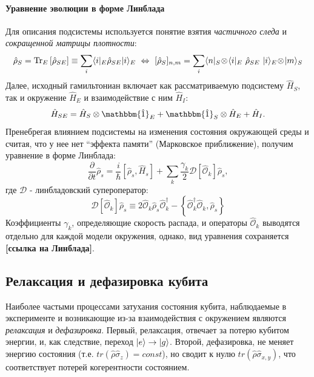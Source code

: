 \documentclass[12pt, twoside]{report}
\newcommand{\pTr}[2]{\text{Tr}_{#1}\left[#2\right]}
\DeclarePairedDelimiter\bra{\langle}{\rvert}
\DeclarePairedDelimiter\ket{\lvert}{\rangle}
\newcommand{\sbrkt}[1]{\left[ #1 \right]}
\numberwithin{equation}{section}
\numberwithin{figure}{section}
\begin{document}
\paragraph{Уравнение эволюции в форме Линблада}
Для описания подсистемы используется понятие взятия \textit{частичного следа} и \textit{сокращенной матрицы плотности}: 
\[
\hat \rho_S = \pTr{E}{\hat \rho_{SE}} \equiv \sum_i \bra{i}_E \hat \rho_{SE} \ket{i}_E \ \Leftrightarrow \ [\hat \rho_S]_{n, m} = \sum_i \bra{n}_S \! \otimes\! \bra{i}_E\ \hat \rho_{SE}\ \ket{i}_E\!\otimes\! \ket{m}_S
\] 
Далее, исходный гамильтониан включает как рассматриваемую подсистему $\hat{H}_S$, так и окружение $\hat{H}_E$ и взаимодействие с ним $\hat{H}_I$:
\begin{equation}
\hat{H}_{SE} = \hat{H}_S \otimes \mathbbm{\hat 1}_E + \mathbbm{\hat 1}_S \otimes \hat{H}_E + \hat{H}_I. 
\end{equation}
Пренебрегая влиянием подсистемы на изменения состояния окружающей среды и считая, что у нее нет ``эффекта памяти'' (Марковское приближение), получим уравнение в форме Линблада:
\begin{equation}
 \frac{\partial}{\partial t}\hat \rho_s = 
 \frac{i}{\hbar}\sbrkt{\hat \rho_s, \hat{H}_s} + \sum_k \frac{\gamma_k}{2} \mathcal{D}\sbrkt{\mathcal{\hat O}_k}\hat \rho_s,
\label{eq:linbladian-equation}
\end{equation}
где $\mathcal{D}$ - линбладовский супероператор:
\begin{equation}
\mathcal{D}\sbrkt{\mathcal{\hat O}_k}\hat \rho_s \equiv 2 \mathcal{\hat O}_k \hat \rho_s \mathcal{\hat O}_k^\dag -  \left\{ \mathcal{\hat O}_k^\dag \mathcal{\hat O}_k, \hat \rho_s \right\}  
\label{eq:linbladian-superoperator}
\end{equation}
Коэффициенты $\gamma_k$, определяющие скорость распада, и операторы $\mathcal{\hat O}_k$ выводятся отдельно для каждой модели окружения, однако, вид уравнения сохраняется \textbf{[ссылка на Линблада]}.

\subsection{Релаксация и дефазировка кубита}
Наиболее частыми процессами затухания состояния кубита, наблюдаемые в эксперименте и возникающие из-за взаимодействия с окружением являются \textit{релаксация} и \textit{дефазировка}. Первый, релаксация, отвечает за потерю кубитом энергии, и, как следствие, переход $\ket{e} \rightarrow \ket{g}$. Второй, дефазировка, не меняет энергию состояния (т.е. $tr\left(\hat \rho \hat \sigma_z\right) = const$), но сводит к нулю $tr\left(\hat \rho \hat \sigma_{x,y}\right)$, что соответствует потерей когерентности состоянием.
\end{document}
